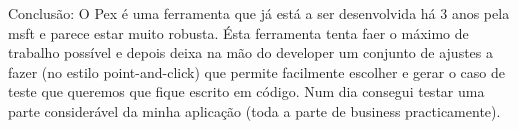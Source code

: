 \documentclass[citeauthoryear]{llncs}
\begin{document}
Conclusão: O Pex é uma ferramenta que já está a ser desenvolvida há 3 anos pela msft e parece estar muito robusta. Ésta ferramenta tenta faer o máximo de trabalho possível e depois deixa na mão do developer um conjunto de ajustes a fazer (no estilo point-and-click) que permite facilmente escolher e gerar o caso de teste que queremos que fique escrito em código.
Num dia consegui testar uma parte considerável da minha aplicação (toda a parte de business practicamente).




\end{document}
